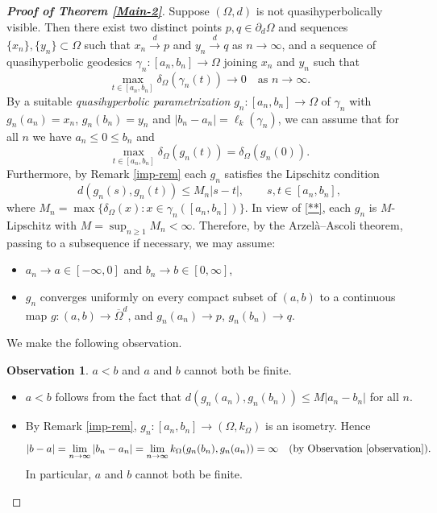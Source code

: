 \documentclass[a4paper,12pt]{amsart}
\theoremstyle{definition}
\newtheorem{observation}{Observation}
\begin{document}
\begin{proof}[\textbf{Proof of Theorem \ref{Main-2}}]
	Suppose $(\Omega,d)$ is not quasihyperbolically visible. Then there exist two distinct points $p,q\in \partial_d \Omega$ and sequences $\{x_{n}\}, \{y_{n}\} \subset \Omega$ such that $x_{n}\stackrel{d}{\to} p$ and $y_{n}\stackrel{d}{\to} q$ as $n\to \infty$, and a sequence of quasihyperbolic geodesics $\gamma_{n}:[a_n,b_n]\to \Omega$ joining $x_n$ and $y_n$ such that
	\begin{equation}\label{**}
		\max_{t\in[a_{n},b_{n}]}\delta_{\Omega} (\gamma_{n}(t)) \rightarrow 0 \quad \text{as } n \rightarrow \infty.
	\end{equation}
	By a suitable {\it quasihyperbolic parametrization} $g_n:[a_{n},b_{n}] \rightarrow \Omega$ of $\gamma_{n}$ with $g_{n}(a_{n}) = x_{n}$, $g_{n}(b_{n}) = y_{n}$ and $|b_n-a_n|=\ell_{k}(\gamma_{n})$, we can assume that for all $n$ we have $a_n\le 0\le b_n$ and
	\begin{equation}\label{***}
		\max_{t\in[a_{n},b_{n}]} \delta_{\Omega} (g_{n}(t))=\delta_{\Omega}(g_{n}(0)).
	\end{equation}
	Furthermore, by Remark \ref{imp-rem} each $g_n$ satisfies the Lipschitz condition
	$$d(g_n(s),g_n(t))\le M_n|s-t|,\qquad s,t\in [a_n,b_n],$$
	where $M_n=\max\{\delta_{\Omega}(x):x\in \gamma_n([a_n,b_n])\}$. In view of \eqref{**}, each $g_n$ is $M$-Lipschitz with $M=\sup_{n\ge 1} M_n<\infty$. Therefore, by the Arzel\`a--Ascoli theorem, passing to a subsequence if necessary, we may assume:
	\begin{itemize}
		\item[(i)] $a_{n}\rightarrow a \in [-\infty,0]$ and $b_{n} \rightarrow b \in [0,\infty]$,
		\item[(ii)] $g_{n}$ converges uniformly on every compact subset of $(a,b)$ to a continuous map $g:(a,b)\rightarrow \overline{\Omega}^d$, and $g_{n}(a_{n}) \rightarrow p$, $g_{n}(b_{n}) \rightarrow q$.
	\end{itemize}
	
	We make the following observation.
	\begin{observation}\label{O}
		$a<b$ and $a$ and $b$ cannot both be finite.
		\begin{itemize}
			\item[(i)] $a<b$ follows from the fact that $d(g_n(a_n),g_n(b_n))\le M|a_n-b_n|$ for all $n$.
			\item[(ii)] By Remark \ref{imp-rem}, $g_n:[a_n,b_n]\to (\Omega,k_{\Omega})$ is an isometry. Hence
			$$|b-a|=\lim_{n\to \infty}|b_n-a_n|=\lim_{n\to \infty}k_{\Omega}(g_{n}(b_n),g_{n}(a_n))=\infty
			\quad (\mbox{by Observation \ref{observation}}).$$
			In particular, $a$ and $b$ cannot both be finite.
		\end{itemize}
	\end{observation}
	

\end{proof}
\end{document}
